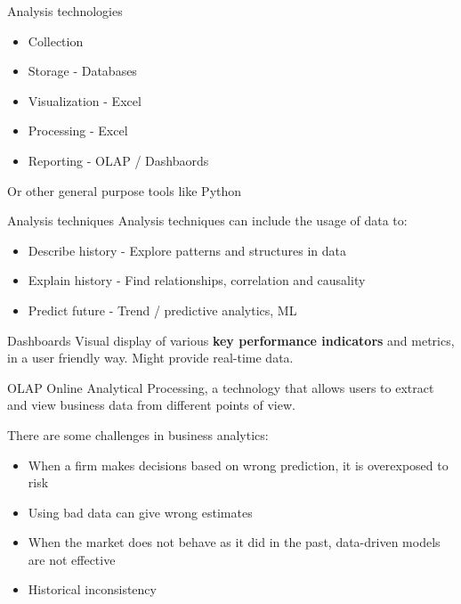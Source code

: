 \begin{theorem}
    {Analysis technologies}
    \begin{itemize}
        \item Collection
        \item Storage - Databases
        \item Visualization - Excel
        \item Processing - Excel
        \item Reporting - OLAP / Dashbaords
    \end{itemize}
    Or other general purpose tools like Python
\end{theorem}
\label{analysis:technology}

\begin{theorem}
    {Analysis techniques}
    Analysis techniques can include the usage of data to:
    \begin{itemize}
        \item Describe history - Explore patterns and structures in data
        \item Explain history - Find relationships, correlation and causality
        \item Predict future - Trend / predictive analytics, ML
    \end{itemize}
\end{theorem}
\label{analysis:technique}

\begin{knBox}
    {Dashboards}
    Visual display of various \textbf{key performance indicators} and metrics, in a user friendly way. Might provide real-time data.
\end{knBox}

\begin{knBox}
    {OLAP}
    Online Analytical Processing, a technology that allows users to extract and view business data from different points of view.
\end{knBox}

There are some challenges in business analytics:

\begin{itemize}
    \item When a firm makes decisions based on wrong prediction, it is overexposed to risk
    \item Using bad data can give wrong estimates
    \item When the market does not behave as it did in the past, data-driven models are not effective
    \item Historical inconsistency
\end{itemize}
